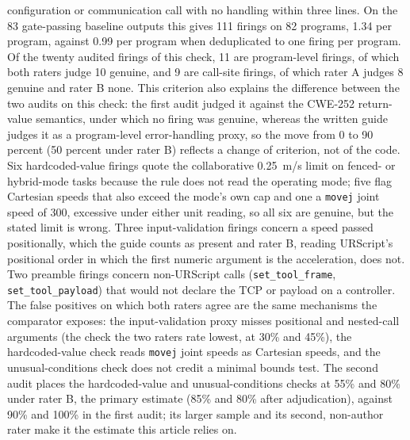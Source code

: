 \documentclass{ieeeaccess}
\begin{document}
configuration or communication call with no handling within three lines. On the 83
gate-passing baseline outputs this gives 111 firings on 82 programs, 1.34 per program,
against 0.99 per program when deduplicated to one firing per program. Of the twenty
audited firings of this check, 11 are program-level firings, of which both raters judge
10 genuine, and 9 are call-site firings, of which rater A judges 8 genuine and rater B
none. This criterion also
explains the difference between the two audits on this check: the first audit judged
it against the CWE-252 return-value semantics, under which no firing was genuine,
whereas the written guide judges it as a program-level error-handling proxy, so the
move from 0 to 90 percent (50 percent under rater B) reflects a change of criterion,
not of the code. Six hardcoded-value
firings quote the collaborative 0.25~m/s limit on fenced- or hybrid-mode tasks because
the rule does not read the operating mode; five flag Cartesian speeds that also exceed the
mode's own cap and one a \texttt{movej} joint speed of 300, excessive under either unit
reading, so all six are genuine, but the stated limit is wrong. Three input-validation
firings concern a speed passed positionally, which the guide counts as present and rater
B, reading URScript's positional order in which the first numeric argument is the
acceleration, does not. Two preamble firings concern non-URScript calls
(\texttt{set\_tool\_frame}, \texttt{set\_tool\_payload}) that would not declare the TCP
or payload on a controller. The false positives on which both raters agree are the same
mechanisms the comparator exposes: the input-validation proxy misses positional and
nested-call arguments (the check the two raters rate lowest, at 30\% and 45\%), the
hardcoded-value check reads \texttt{movej} joint speeds as Cartesian speeds, and the
unusual-conditions check does not credit a minimal bounds test. The second audit places
the hardcoded-value and unusual-conditions checks at 55\% and 80\% under rater B, the
primary estimate (85\% and 80\% after adjudication), against 90\% and 100\% in the first
audit; its larger sample
and its second, non-author rater make it the estimate this article relies on.
\end{document}
